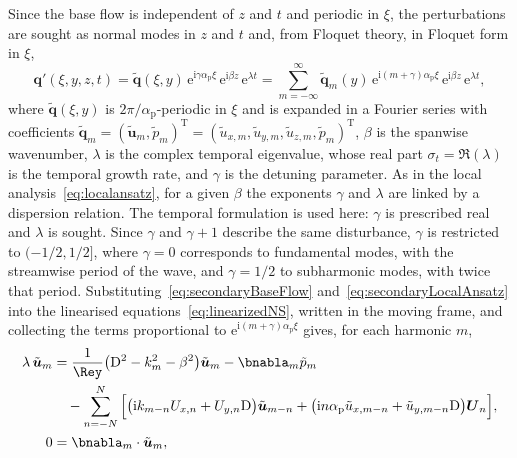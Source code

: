 \documentclass[lineno]{jfm}
\newcommand\awave{{\alpha_\mathrm{p}}} %
\begin{document}
Since the base flow is independent of $z$ and $t$ and periodic in $\xi$, the perturbations are sought as normal modes in $z$ and $t$ and, from Floquet theory, in Floquet form in $\xi$,
\begin{equation}\label{eq:secondaryLocalAnsatz}
	\boldsymbol{q}'(\xi,y,z,t)
	=\tilde{\boldsymbol{q}}(\xi,y)\,\mathrm{e}^{\mathrm{i}\gamma\awave\xi}\,\mathrm{e}^{\mathrm{i}\beta z}\,\mathrm{e}^{\lambda t}
	=\sum_{m=-\infty}^{\infty}\tilde{\boldsymbol{q}}_m(y)\,\mathrm{e}^{\mathrm{i}(m+\gamma)\awave\xi}\,\mathrm{e}^{\mathrm{i}\beta z}\,\mathrm{e}^{\lambda t},
\end{equation}
where $\tilde{\boldsymbol{q}}(\xi,y)$ is $2\pi/\awave$-periodic in $\xi$ and is expanded in a Fourier series with coefficients $\tilde{\boldsymbol{q}}_m={(\tilde{\boldsymbol{u}}_m,\tilde{p}_m)}^\mathrm{T}={(\tilde{u}_{x,m},\tilde{u}_{y,m},\tilde{u}_{z,m},\tilde{p}_m)}^\mathrm{T}$, $\beta$ is the spanwise wavenumber, $\lambda$ is the complex temporal eigenvalue, whose real part $\sigma_t=\Re(\lambda)$ is the temporal growth rate, and $\gamma$ is the detuning parameter. As in the local analysis~\eqref{eq:localansatz}, for a given $\beta$ the exponents $\gamma$ and $\lambda$ are linked by a dispersion relation. The temporal formulation is used here: $\gamma$ is prescribed real and $\lambda$ is sought. Since $\gamma$ and $\gamma+1$ describe the same disturbance, $\gamma$ is restricted to $(-1/2,1/2]$, where $\gamma=0$ corresponds to fundamental modes, with the streamwise period of the wave, and $\gamma=1/2$ to subharmonic modes, with twice that period. Substituting~\eqref{eq:secondaryBaseFlow} and~\eqref{eq:secondaryLocalAnsatz} into the linearised equations~\eqref{eq:linearizedNS}, written in the moving frame, and collecting the terms proportional to $\mathrm{e}^{\mathrm{i}(m+\gamma)\awave\xi}$ gives, for each harmonic $m$,
\begin{equation}\label{eq:secondaryHarmonic}
	\begin{aligned}
		\lambda\,\tilde{\boldsymbol{u}}_m & = \frac{1}{\Rey}\big(\mathrm{D}^2-k_m^2-\beta^2\big)\tilde{\boldsymbol{u}}_m-\bnabla_m\tilde{p}_m                                                                                              \\
		                                  & \quad-\sum_{n=-N}^{N}\Big[\big(\mathrm{i}k_{m-n}U_{x,n}+U_{y,n}\mathrm{D}\big)\tilde{\boldsymbol{u}}_{m-n}+\big(\mathrm{i}n\awave\tilde{u}_{x,m-n}+\tilde{u}_{y,m-n}\mathrm{D}\big)\boldsymbol{U}_n\Big], \\
		0                                 & = \bnabla_m\cdot\tilde{\boldsymbol{u}}_m,
	\end{aligned}
\end{equation}
\end{document}
